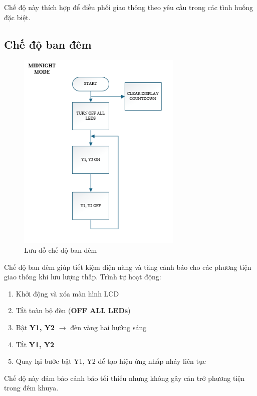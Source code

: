 Chế độ này thích hợp để điều phối giao thông theo yêu cầu trong các tình huống đặc biệt.

\subsection{Chế độ ban đêm}
\begin{figure}[H]
    \centering
    \includegraphics[width=0.7\textwidth]{pictures/night.png}
    \caption{Lưu đồ chế độ ban đêm}
\end{figure}
\cleardoublepage
Chế độ ban đêm giúp tiết kiệm điện năng và tăng cảnh báo cho các phương tiện giao thông khi lưu lượng thấp. Trình tự hoạt động:

\begin{enumerate}
  \item Khởi động và xóa màn hình LCD
  \item Tắt toàn bộ đèn (\textbf{OFF ALL LEDs})
  \item Bật \textbf{Y1, Y2} $\rightarrow$ đèn vàng hai hướng sáng
  \item Tắt \textbf{Y1, Y2}
  \item Quay lại bước bật Y1, Y2 để tạo hiệu ứng nhấp nháy liên tục
\end{enumerate}

Chế độ này đảm bảo cảnh báo tối thiểu nhưng không gây cản trở phương tiện trong đêm khuya.